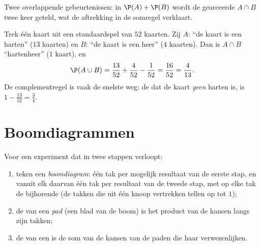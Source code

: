 \begin{omfigure}

{\small Twee overlappende gebeurtenissen: in $\P(A) + \P(B)$ wordt de
gearceerde  $A \cap B$ twee keer geteld, wat de aftrekking in de
somregel verklaart.}
\end{omfigure}

\begin{example}\label{ex:g10:proba:cards}
Trek één kaart uit een standaardspel van $52$ kaarten. Zij $A$: ``de kaart is
een harten'' ($13$ kaarten) en $B$: ``de kaart is een heer'' ($4$ kaarten).
Dan is $A \cap B$ ``hartenheer'' ($1$ kaart), en
\[
\P(A \cup B) = \frac{13}{52} + \frac{4}{52} - \frac{1}{52} = \frac{16}{52}
= \frac{4}{13}.
\]
De complementregel is vaak de snelste weg: de  dat de kaart \emph{geen}
harten is, is $1 - \frac{13}{52} = \frac34$.
\end{example}

\section{Boomdiagrammen}

\begin{method}\label{met:g10:proba:tree}
Voor een experiment dat in twee stappen verloopt:
\begin{enumerate}
  \item teken een \emph{boomdiagram}: één tak per mogelijk
        resultaat van de eerste stap, en vanuit elk daarvan één tak per
        resultaat van de tweede stap, met op elke tak de bijhorende  (de
        takken die uit één knoop vertrekken tellen op tot $1$);
  \item de  van een \emph{pad} (een blad van de boom) is het product van
        de kansen langs zijn takken;
  \item de  van een  is de som van de kansen van de paden die
        haar verwezenlijken.
\end{enumerate}
\end{method}

